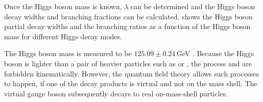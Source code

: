 Once the Higgs boson mass is known, $\lambda$ can be determined and the Higgs boson decay widths and branching fractions can be calculated.  shows the Higgs boson partial decay widths and the branching ratios as a function of the Higgs boson mass for different Higgs decay modes.






The Higgs boson mass is measured to be $125.09\pm0.24$\,GeV \cite{Agashe:2014kda}. Because the Higgs boson is lighter than a pair of heavier particles such as \HepProcess{\PWp\PWm} or \HepProcess{\PZ\PZ}, the process \HepProcess{\PH \to \PWp\PWm} and \HepProcess{\PH \to \PZ\PZ} are forbidden kinematically. However,  the quantum field theory allows such processes to happen, if one of the decay products is virtual and not on the mass shell. The virtual gauge boson subsequently decays to real on-mass-shell particles.


